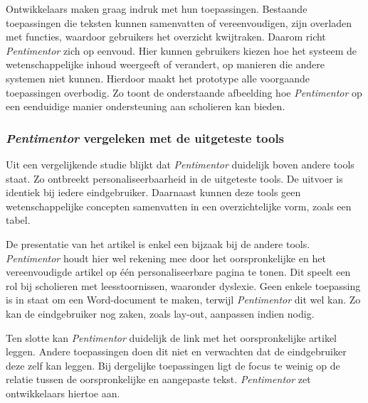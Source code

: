 \documentclass[a4paper,9pt,twoside]{report}
\begin{document}
\noindent Ontwikkelaars maken graag indruk met hun toepassingen. Bestaande toepassingen die teksten kunnen samenvatten of vereenvoudigen, zijn overladen met functies, waardoor gebruikers het overzicht kwijtraken. Daarom richt \textit{Pentimentor} zich op eenvoud. Hier kunnen gebruikers kiezen hoe het systeem de wetenschappelijke inhoud weergeeft of verandert, op manieren die andere systemen niet kunnen. Hierdoor maakt het prototype alle voorgaande toepassingen overbodig. Zo toont de onderstaande afbeelding hoe \textit{Pentimentor} op een eenduidige manier ondersteuning aan scholieren kan bieden.

\begin{figure}[H]
\end{figure}
	
\subsubsection{\textit{Pentimentor} vergeleken met de uitgeteste tools}

Uit een vergelijkende studie blijkt dat \textit{Pentimentor} duidelijk boven andere tools staat. Zo ontbreekt personaliseerbaarheid in de uitgeteste tools. De uitvoer is identiek bij iedere eindgebruiker. Daarnaast kunnen deze tools geen wetenschappelijke concepten samenvatten in een overzichtelijke vorm, zoals een tabel.

\medspace

\noindent De presentatie van het artikel is enkel een bijzaak bij de andere tools. \textit{Pentimentor} houdt hier wel rekening mee door het oorspronkelijke en het vereenvoudigde artikel op één personaliseerbare pagina te tonen. Dit speelt een rol bij scholieren met leesstoornissen, waaronder dyslexie. Geen enkele toepassing is in staat om een Word-document te maken, terwijl \textit{Pentimentor} dit wel kan. Zo kan de eindgebruiker nog zaken, zoals lay-out, aanpassen indien nodig.

\medspace

\noindent Ten slotte kan \textit{Pentimentor} duidelijk de link met het oorspronkelijke artikel leggen. Andere toepassingen doen dit niet en verwachten dat de eindgebruiker deze zelf kan leggen. Bij dergelijke toepassingen ligt de focus te weinig op de relatie tussen de oorspronkelijke en aangepaste tekst. \textit{Pentimentor} zet ontwikkelaars hiertoe aan.
\end{document}
